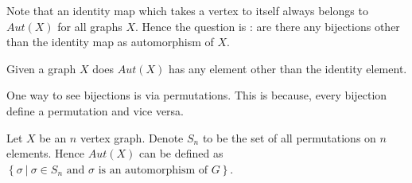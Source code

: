 Note that an identity map which takes a vertex to itself always belongs to
$Aut(X)$ for all graphs $X$. Hence the question is : are there any bijections
other than the identity map as automorphism of $X$.

\begin{problem}
	Given a graph $X$ does $Aut(X)$ has any element other than the
	identity element.
\end{problem}

One way to see bijections is via permutations. This is because, every
bijection define a permutation and vice versa.

Let $X$ be an $n$ vertex graph. 
Denote $S_n$ to be the set of all permutations on $n$ elements. Hence $Aut(X)$
can be defined as $\left\{ \sigma ~|~ \sigma \in S_n \text{ and $\sigma$ is an
automorphism of } G\right\}$. 

